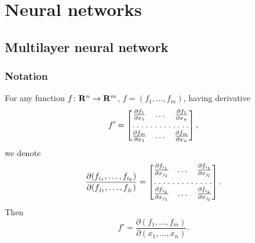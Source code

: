 \chapter{Neural networks}

\section{Multilayer neural network}

\subsection{Notation}

For any function $f \colon \mathbf{R}^n \rightarrow \mathbf{R}^m$, $f = (f_1,
\ldots, f_m)$, having derivative
\begin{equation*}
  f'=
  \begin{bmatrix}
    \frac{\partial f_1}{\partial x_1} & \dots &
      \frac{\partial f_1}{\partial x_n} \\
    \hdotsfor[1.5]{3} \\
    \frac{\partial f_m}{\partial x_1} & \dots &
      \frac{\partial f_m}{\partial x_n}
  \end{bmatrix},
\end{equation*}
we denote
\begin{equation*}
  \frac{\partial(f_{i_1}, \ldots, f_{i_k})}{\partial(f_{j_1}, \ldots,
    f_{j_l})} =
  \begin{bmatrix}
    \frac{\partial f_{i_1}}{\partial x_{j_1}} & \dots &
      \frac{\partial f_{i_1}}{\partial x_{j_l}} \\
    \hdotsfor[1.5]{3} \\
    \frac{\partial f_{i_k}}{\partial x_{j_1}} & \dots &
      \frac{\partial f_{i_k}}{\partial x_{j_l}}
  \end{bmatrix}.
\end{equation*}
Then
\begin{equation*}
  f' = \frac{\partial(f_1, \ldots, f_m)}{\partial(x_1, \ldots, x_n)}.
\end{equation*}

